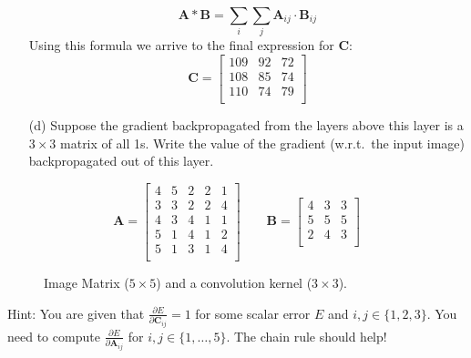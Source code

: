\documentclass{article}
\newcommand{\matr}[1]{\bm{#1}}     %
\begin{document}
\begin{itemize}
    \begin{equation*}
        \matr{A} * \matr{B} = \sum_i \sum_j \matr{A}_{ij} \cdot \matr{B}_{ij}
    \end{equation*}
    Using this formula we arrive to the final expression for $\matr{C}$:
    \begin{equation*}
        \matr{C} = \begin{bmatrix} 
                        109 & 92 & 72 \\
                        108 & 85 & 74 \\
                        110 & 74 & 79 \\
                    \end{bmatrix}
    \end{equation*}
    \item[(d)] Suppose the gradient backpropagated from the layers above this layer is a $3\times 3$ matrix of all 1s. Write the value of the gradient (w.r.t.~the input image) backpropagated out of this layer.
\end{itemize}
 
\begin{figure}[!ht]
    \begin{equation*}
        \matr{A} = \begin{bmatrix} 
                        4 & 5 & 2 & 2 & 1 \\
                        3 & 3 & 2 & 2 & 4 \\ 
                        4 & 3 & 4 & 1 & 1 \\ 
                        5 & 1 & 4 & 1 & 2 \\ 
                        5 & 1 & 3 & 1 & 4 \\ 
                    \end{bmatrix}
        \quad \quad
        \matr{B} = \begin{bmatrix} 
                        4 & 3 & 3 \\
                        5 & 5 & 5 \\
                        2 & 4 & 3 \\
                    \end{bmatrix}
    \end{equation*}
    \caption{Image Matrix ($5\times 5$) and a convolution kernel ($3\times 3$).}
    \label{fig1}
\end{figure}

 Hint: You are given that $\frac{\partial E}{\partial \matr{C}_{ij}} = 1$ for some scalar error $E$ and $i,j\in\{1,2,3\}$. You need to compute $\frac{\partial E}{\partial \matr{A}_{ij}}$ for  $i,j\in\{1, \ldots, 5\}$. The chain rule should help!
 
\end{document}

